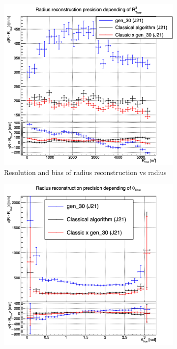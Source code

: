\documentclass[../main.tex]{subfiles}
\begin{document}
{{\begin{figure}[ht]
  \begin{subfigure}[t]{0.32\linewidth}
    \centering
    \includegraphics[width=\linewidth]{images/jcnn/vic_cnn/multi_vic_cnn_Cx30_MSBvRTC.png}
    \caption{Resolution and bias of radius reconstruction vs radius}
    \label{fig:jcnn:vic_cnn:multi_vic_cnn_Cx30_MSBvRTC}
  \end{subfigure}
  \begin{subfigure}[t]{0.32\linewidth}
    \centering
    \includegraphics[width=\linewidth]{images/jcnn/vic_cnn/multi_vic_cnn_Cx30_MSBvTTC.png}

\end{subfigure}
\end{figure}}}
\end{document}
